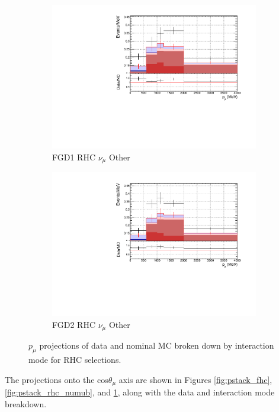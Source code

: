 \begin{figure}[!htbp]
\begin{subfigure}{0.49\textwidth}
  \centering
  \includegraphics[width=\textwidth]{figs/FGD1_NuMuBkg_CCOther_in_AntiNu_Mode_p}
  \caption{FGD1 RHC $\nu_{\mu}$ Other}
\end{subfigure}
\begin{subfigure}{0.49\textwidth}
  \centering
  \includegraphics[width=\textwidth]{figs/FGD2_NuMuBkg_CCOther_in_AntiNu_Mode_p}
  \caption{FGD2 RHC $\nu_{\mu}$ Other}
\end{subfigure}
\caption{$p_{\mu}$ projections of data and nominal MC broken down by interaction mode for RHC \numu selections.}
\label{fig:pstack_rhc_numu}
\end{figure}

The projections onto the cos$\theta_{\mu}$ axis are shown in Figures \ref{fig:pstack_fhc}, \ref{fig:pstack_rhc_numub}, and \ref{fig:pstack_rhc_numu}, along with the data and interaction mode breakdown.

